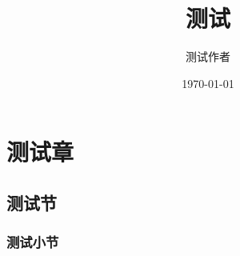 \documentclass{psythesis}
\title{\zihao{3}\sffamily\bfseries 测试}
\author{\zihao{4} 测试作者}
\date{\zihao{-4}\today}
\begin{document}
    \maketitle

    \section{测试章}
    \subsection{测试节}
    \subsubsection{测试小节}
    \zhlipsum[name=xiangyu]
\end{document}
